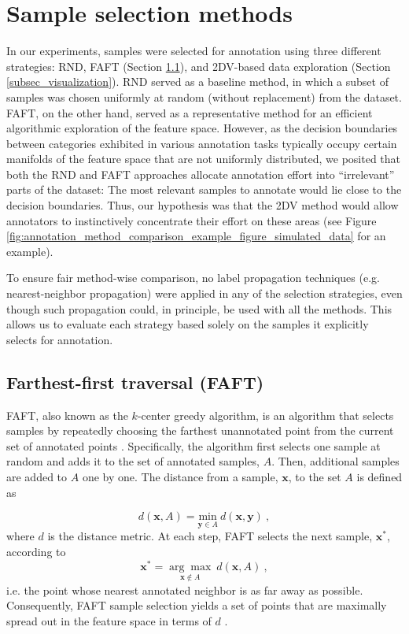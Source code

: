 \documentclass[a4paper,fleqn]{cas-dc}
\begin{document}
\section{Sample selection methods} \label{sec_sample_selection_methods}

In our experiments, samples were selected for annotation using three different strategies: RND, FAFT (Section \ref{subsec_faft}), and 2DV-based data exploration (Section \ref{subsec_visualization}). RND served as a baseline method, in which a subset of samples was chosen uniformly at random (without replacement) from the dataset. FAFT, on the other hand, served as a representative method for an efficient algorithmic exploration of the feature space. However, as the decision boundaries between categories exhibited in various annotation tasks typically occupy certain manifolds of the feature space that are not uniformly distributed, we posited that both the RND and FAFT approaches allocate annotation effort into ``irrelevant'' parts of the dataset: The most relevant samples to annotate would lie close to the decision boundaries. Thus, our hypothesis was that the 2DV method would allow annotators to instinctively concentrate their effort on these areas (see Figure \ref{fig:annotation_method_comparison_example_figure_simulated_data} for an example).

To ensure fair method-wise comparison, no label propagation techniques (e.g. nearest-neighbor propagation) were applied in any of the selection strategies, even though such propagation could, in principle, be used with all the methods. This allows us to evaluate each strategy based solely on the samples it explicitly selects for annotation.


\subsection{Farthest-first traversal (FAFT)} \label{subsec_faft}

FAFT, also known as the $k$-center greedy algorithm, is an algorithm that selects samples by repeatedly choosing the farthest unannotated point from the current set of annotated points \cite{faft_original, faft_original_gonzalez}. Specifically, the algorithm first selects one sample at random and adds it to the set of annotated samples, $A$. Then, additional samples are added to $A$ one by one. The distance from a sample, $\bm{x}$, to the set $A$ is defined as

\begin{equation} \label{eq_faft_distance}
    d(\bm{x},A) = \underset{\bm{y}\in A}{\textrm{min}} \ d(\bm{x},\bm{y}) \ ,
\end{equation}
%
where $d$ is the distance metric. At each step, FAFT selects the next sample, $\mathbf{x}^*$, according to
%
\begin{equation} \label{eq_faft_sample_selection}
    \mathbf{x}^* = \underset{\mathbf{x}\notin A}{\arg\max} \ d(\mathbf{x},A) \ ,
\end{equation}
%
i.e. the point whose nearest annotated neighbor is as far away as possible. Consequently, FAFT sample selection yields a set of points that are maximally spread out in the feature space in terms of $d$ \cite{faft_original_gonzalez}.
\end{document}

